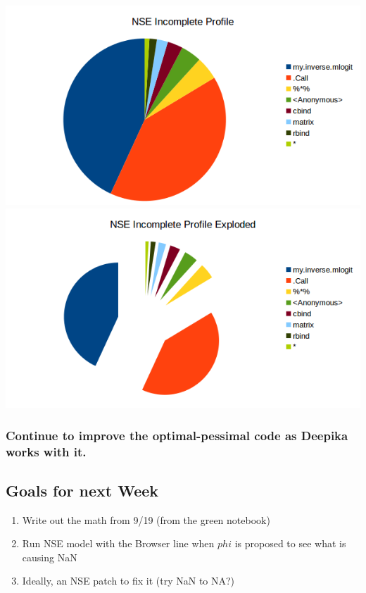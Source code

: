 \documentclass[11pt]{article} %
\begin{document}
\includegraphics{data/NSE_IncompleteProfile}
\includegraphics{data/NSE_IncompleteProfilexplode}



\subsubsection{Continue to improve the optimal-pessimal code as Deepika works with it.}





\subsection{Goals for next Week}
\begin{enumerate}
\item Write out the math from 9/19 (from the green notebook)
\item Run NSE model with the Browser line when $phi$ is proposed to see what is causing NaN
\item Ideally, an NSE patch to fix it (try NaN to NA?)
\end{enumerate}
\end{document}
